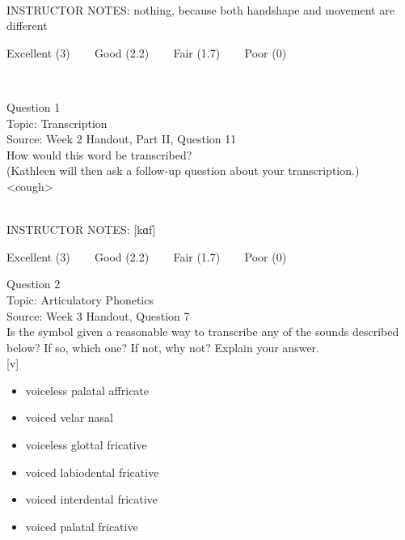 \documentclass[12pt]{article}
\begin{document}
~\\
INSTRUCTOR NOTES: nothing, because both handshape and movement are different


\vfill
Excellent (3) ~~~ Good (2.2) ~~~ Fair (1.7) ~~~ Poor (0)
\newpage

\begin{center}
\textbf{{\color{red}{\HUGE END OF EXAM}}}\\

\end{center}
\newpage

\begin{center}
\textbf{{\color{blue}{\HUGE START OF EXAM\\}}}

\textbf{{\color{blue}{\HUGE Student ID: 99531\\}}}

\textbf{{\color{blue}{\HUGE \\}}}

\end{center}
\newpage

{\large Question 1}\\

Topic: Transcription\\
Source: Week 2 Handout, Part II, Question 11\\

How would this word be transcribed?\\ (Kathleen will then ask a follow-up question about your transcription.)\\

<cough>


~\\
INSTRUCTOR NOTES: [kɑf]


\vfill
Excellent (3) ~~~ Good (2.2) ~~~ Fair (1.7) ~~~ Poor (0)
\newpage

{\large Question 2}\\

Topic: Articulatory Phonetics\\
Source: Week 3 Handout, Question 7\\

Is the symbol given a reasonable way to transcribe any of the sounds described below? If so, which one? If not, why not? Explain your answer.\\

{[v]}

\begin{itemize} \item voiceless palatal affricate \item voiced velar nasal \item voiceless glottal fricative \item voiced labiodental fricative \item voiced interdental fricative \item voiced palatal fricative \end{itemize}
\end{document}
